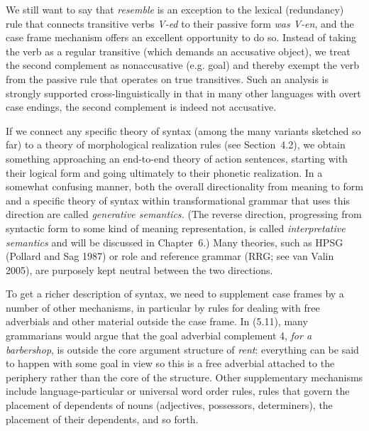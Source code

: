 We still want to say that {\it resemble} is an exception to the lexical
(redundancy) rule that connects transitive verbs {\it V-ed} to their passive
form {\it was V-en}, and the case frame mechanism offers an excellent
opportunity to do so. Instead of taking the verb as a regular transitive
(which demands an accusative object), we treat the second complement as
nonaccusative (e.g. goal) and thereby exempt the verb from the passive rule
that operates on true transitives. Such an analysis is strongly supported
cross-linguistically in that in many other languages with overt case endings,
the second complement is indeed not accusative.

If we connect any specific theory of syntax (among the many variants sketched
so far) to a theory of morphological realization rules (see Section~4.2), we
obtain something approaching an end-to-end theory of action sentences,
starting with their logical form and going ultimately to their phonetic
realization. In a somewhat confusing manner, both the overall directionality
from meaning to form and a specific theory of syntax within transformational
grammar that uses this direction are called {\it generative semantics.} (The
reverse direction, progressing from syntactic form to some kind of meaning
representation, is called {\it interpretative semantics} and will be discussed
in Chapter~6.) Many theories, such as HPSG (Pollard and Sag 1987) or role and
reference grammar (RRG; see van Valin 2005), are purposely kept neutral
between the two directions.  \nocite{Pollard:1987} \nocite{Valin:2005}


To get a richer description of syntax, we need to supplement case frames by a
number of other mechanisms, in particular by rules for dealing with free
adverbials and other material outside the case frame. In (5.11), many
grammarians would argue that the goal adverbial complement 4, {\it for a
barbershop}, is outside the core argument structure of {\it rent}: everything
can be said to happen with some goal in view so this is a free adverbial
attached to the periphery rather than the core of the structure. Other
supplementary mechanisms include language-particular or universal word order
rules, rules that govern the placement of dependents of nouns (adjectives,
possessors, determiners), the placement of their dependents, and so forth. 

